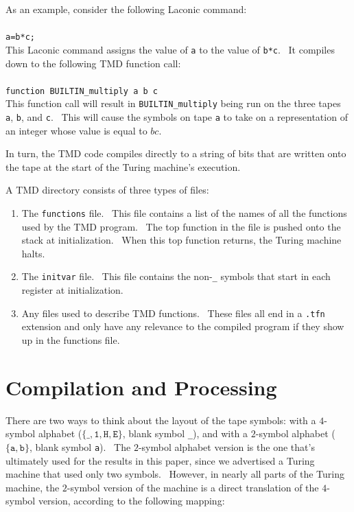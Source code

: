 \documentclass[11pt]{article}
\begin{document}
As an example, consider the following Laconic command: \\ \\
\texttt{a=b*c;} \\

This Laconic command assigns the value of \texttt{a} to the value of \texttt{b*c}. \ It compiles down to the following TMD function call: \\ \\
\texttt{function BUILTIN\_multiply a b c} \\

This function call will result in \texttt{BUILTIN\_multiply} being run on the three tapes \texttt{a}, \texttt{b}, and \texttt{c}. \ This will cause the symbols on tape \texttt{a} to take on a representation of an integer whose value is equal to $bc$.

In turn, the TMD code compiles directly to a string of bits that are written onto the tape at the start of the Turing machine's execution.

A TMD directory consists of three types of files:

\begin{enumerate}
\item The \texttt{functions} file. \ This file contains a list of the names of all the functions used by the TMD program. \ The top function in the file is pushed onto the stack at initialization. \ When this top function returns, the Turing machine halts.
\item The \texttt{initvar} file. \ This file contains the non-\texttt{\_} symbols that start in each register at initialization.
\item Any files used to describe TMD functions. \ These files all end in a \texttt{.tfn} extension and only have any relevance to the compiled program if they show up in the functions file.
\end{enumerate}

\section{Compilation and Processing}
\label{COMP}

There are two ways to think about the layout of the tape symbols: with a $4$-symbol alphabet ($\{\texttt{\_}, \texttt{1}, \texttt{H}, \texttt{E}\}$, blank symbol \texttt{\_}), and with a $2$-symbol alphabet ($\{\texttt{a}, \texttt{b}\}$, blank symbol \texttt{a}). \ The $2$-symbol alphabet version is the one that's ultimately used for the results in this paper, since we advertised a Turing machine that used only two symbols. \ However, in nearly all parts of the Turing machine, the $2$-symbol version of the machine is a direct translation of the $4$-symbol version, according to the following mapping:
\end{document}
